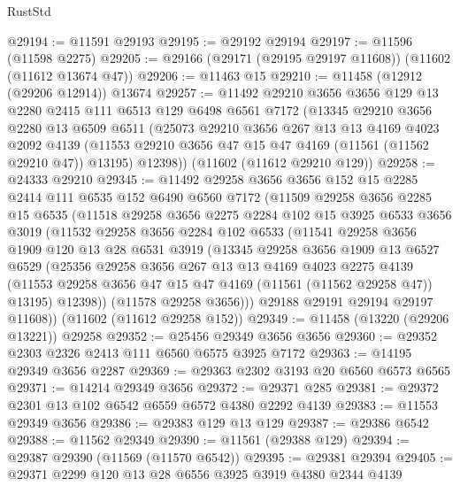 \begin{lexlean}{RustStd}
\begin{coremodule}
@29194 := @11591 @29193
@29195 := @29192 @29194
@29197 := @11596 (@11598 @2275)
@29205 := @29166 (@29171 (@29195 @29197 @11608)) (@11602 (@11612 @13674 @47))
@29206 := @11463 @15
@29210 := @11458 (@12912 (@29206 @12914)) @13674
@29257 := @11492
    @29210
    @3656
    @3656
    @129
    @13
    @2280
    @2415
    @111
    @6513
    @129
    @6498
    @6561
    @7172
    (@13345
      @29210
      @3656
      @2280
      @13
      @6509
      @6511
      (@25073
        @29210
        @3656
        @267
        @13
        @13
        @4169
        @4023
        @2092
        @4139
        (@11553 @29210 @3656 @47 @15 @47 @4169 (@11561 (@11562 @29210 @47)) @13195)
        @12398))
    (@11602 (@11612 @29210 @129))
@29258 := @24333 @29210
@29345 := @11492
    @29258
    @3656
    @3656
    @152
    @15
    @2285
    @2414
    @111
    @6535
    @152
    @6490
    @6560
    @7172
    (@11509
      @29258
      @3656
      @2285
      @15
      @6535
      (@11518
        @29258
        @3656
        @2275
        @2284
        @102
        @15
        @3925
        @6533
        @3656
        @3019
        (@11532
          @29258
          @3656
          @2284
          @102
          @6533
          (@11541
            @29258
            @3656
            @1909
            @120
            @13
            @28
            @6531
            @3919
            (@13345
              @29258
              @3656
              @1909
              @13
              @6527
              @6529
              (@25356
                @29258
                @3656
                @267
                @13
                @13
                @4169
                @4023
                @2275
                @4139
                (@11553 @29258 @3656 @47 @15 @47 @4169 (@11561 (@11562 @29258 @47)) @13195)
                @12398))
            (@11578 @29258 @3656)))
        @29188
        @29191
        @29194
        @29197
        @11608))
    (@11602 (@11612 @29258 @152))
@29349 := @11458 (@13220 (@29206 @13221)) @29258
@29352 := @25456 @29349 @3656 @3656
@29360 := @29352 @2303 @2326 @2413 @111 @6560 @6575 @3925 @7172
@29363 := @14195 @29349 @3656 @2287
@29369 := @29363 @2302 @3193 @20 @6560 @6573 @6565
@29371 := @14214 @29349 @3656
@29372 := @29371 @285
@29381 := @29372 @2301 @13 @102 @6542 @6559 @6572 @4380 @2292 @4139
@29383 := @11553 @29349 @3656
@29386 := @29383 @129 @13 @129
@29387 := @29386 @6542
@29388 := @11562 @29349
@29390 := @11561 (@29388 @129)
@29394 := @29387 @29390 (@11569 (@11570 @6542))
@29395 := @29381 @29394
@29405 := @29371 @2299 @120 @13 @28 @6556 @3925 @3919 @4380 @2344 @4139

\end{coremodule}
\end{lexlean}
